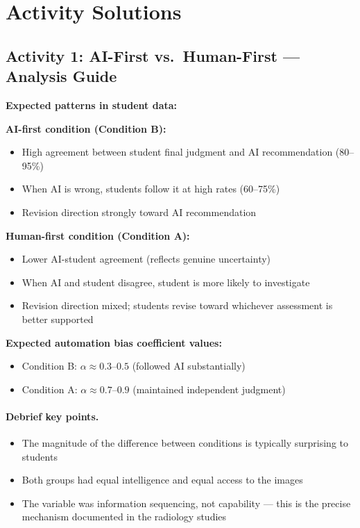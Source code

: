 \section{Activity Solutions}

\subsection{Activity 1: AI-First vs.\ Human-First --- Analysis Guide}

\textbf{Expected patterns in student data:}

\textbf{AI-first condition (Condition B):}
\begin{itemize}
    \item High agreement between student final judgment and AI recommendation (80--95\%)
    \item When AI is wrong, students follow it at high rates (60--75\%)
    \item Revision direction strongly toward AI recommendation
\end{itemize}

\textbf{Human-first condition (Condition A):}
\begin{itemize}
    \item Lower AI-student agreement (reflects genuine uncertainty)
    \item When AI and student disagree, student is more likely to investigate
    \item Revision direction mixed; students revise toward whichever assessment is better supported
\end{itemize}

\textbf{Expected automation bias coefficient values:}
\begin{itemize}
    \item Condition B: $\alpha \approx 0.3$--$0.5$ (followed AI substantially)
    \item Condition A: $\alpha \approx 0.7$--$0.9$ (maintained independent judgment)
\end{itemize}

\paragraph{Debrief key points.}
\begin{itemize}
    \item The magnitude of the difference between conditions is typically surprising to students
    \item Both groups had equal intelligence and equal access to the images
    \item The variable was information sequencing, not capability --- this is the precise mechanism documented in the radiology studies
\end{itemize}

